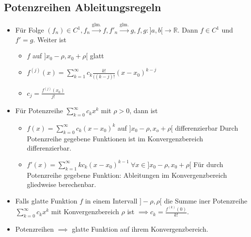 \documentclass[a4paper]{article}
\newcommand\R{\ensuremath{\mathbb{R}}}
\begin{document}
\subsection{Potenzreihen Ableitungsregeln}
\begin{itemize}[leftmargin=4.5mm, topsep=1pt, parsep=1pt]
    \item Für Folge $(f_n) \in C^1, f_n \overset{\text{glm.}}{\to} f, f'_n \overset{\text{glm.}}{\to} g, f,g: ]a,b[ \to \R$. Dann $f \in C^1$ und $f'=g$. Weiter ist
        \begin{itemize}[leftmargin=4.5mm, topsep=1pt, parsep=1pt]
            \item $f$ auf $]x_0 - \rho, x_0 + \rho[$ glatt
            \item $f^{(j)} (x) = \sum_{k=1}^{\infty} c_k \frac{k!}{((k-j)!} (x - x_0)^{k-j}$
            \item $c_j = \frac{f^{(j)}(x_0)}{j!}$
        \end{itemize}
    \item Für Potenzreihe $\sum_{k=0}^{\infty} c_kx^k$ mit $\rho > 0$, dann ist
        \begin{itemize}[leftmargin=4.5mm, topsep=1pt, parsep=1pt]
            \item $f(x) = \sum_{k=0}^{\infty} c_k (x - x_0)^k$ auf $]x_0 - \rho, x_o + \rho[$ differenzierbar
              \tiny \color{gray}
                Durch Potenzreihe gegebene Funktionen ist im Konvergenzbereich differenzierbar.
              \normalsize \color{black}
            \item $f'(x) = \sum_{k=1}^{\infty} kc_k ( x - x_0)^{k-1} \ \forall x \in ]x_0 - \rho, x_0 + \rho[$
              \tiny \color{gray}
                Für durch Potenzreihe gegebene Funktion: Ableitungen im Konvergenzbereich gliedweise berechenbar.
              \normalsize \color{black}
        \end{itemize}
    \item Falls glatte Funktion $f$ in einem Intervall $]-\rho, \rho[$ die Summe iner Potenzreihe $\sum_{k=0}^{\infty} c_kx^k$ mit Konvergenzbereich $\rho$ ist $\implies c_k=\frac{f^{(k)}(0)}{k!}$.
    \item Potenzreihen $\implies$ glatte Funktion auf ihrem Konvergenzbereich.
\end{itemize}
\end{document}
